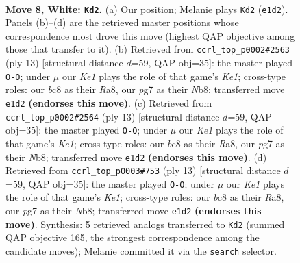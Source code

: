 \documentclass[11pt]{article}
\begin{document}
\begin{figure}[p]\centering
\begin{subfigure}{0.46\textwidth}\centering
\resizebox{\linewidth}{!}{%
\newchessgame
\chessboard[
  setfen={r1b1k2r/ppppqpp1/2n1pn2/7p/2PP4/2B2NP1/PP2PP1P/R2QKB1R w KQkq - 0 8},
  showmover=false,
  pgfstyle=straightmove, color=movearrow, markmove={e1-d2}
]}
\caption{}
\end{subfigure}\hfill
\begin{subfigure}{0.46\textwidth}\centering
\resizebox{\linewidth}{!}{%
\newchessgame
\chessboard[
  setfen={rnbqk2r/pp2ppbp/5np1/3p4/3P4/2N2NP1/PP2PPBP/R1BQK2R b KQkq - 1 7},
  showmover=false,
  pgfstyle=straightmove, color=movearrow, markmove={e8-g8}
]}
\caption{}
\end{subfigure}
\\[4pt]
\begin{subfigure}{0.46\textwidth}\centering
\resizebox{\linewidth}{!}{%
\newchessgame
\chessboard[
  setfen={rnbqk2r/pp2ppbp/5np1/3p4/3P4/2N2NP1/PP2PPBP/R1BQK2R b KQkq - 1 7},
  showmover=false,
  pgfstyle=straightmove, color=movearrow, markmove={e8-g8}
]}
\caption{}
\end{subfigure}\hfill
\begin{subfigure}{0.46\textwidth}\centering
\resizebox{\linewidth}{!}{%
\newchessgame
\chessboard[
  setfen={rnbqk2r/pp2ppbp/5np1/3p4/3P4/2N2NP1/PP2PPBP/R1BQK2R b KQkq - 1 7},
  showmover=false,
  pgfstyle=straightmove, color=movearrow, markmove={e8-g8}
]}
\caption{}
\end{subfigure}
\caption{\textbf{Move 8, White: \texttt{Kd2}.} (a) Our position; Melanie plays \texttt{Kd2} (\texttt{e1d2}). Panels (b)--(d) are the retrieved master positions whose correspondence most drove this move (highest QAP objective among those that transfer to it). (b) Retrieved from \texttt{ccrl\_top\_p0002\#2563} (ply 13) [structural distance $d$=59, QAP obj=35]: the master played \texttt{O-O}; under $\mu$ our \emph{Ke1} plays the role of that game's \emph{Ke1}; cross-type roles: our \emph{b}c8 as their \emph{R}a8, our \emph{p}g7 as their \emph{N}b8; transferred move \texttt{e1d2} \textbf{(endorses this move)}. (c) Retrieved from \texttt{ccrl\_top\_p0002\#2564} (ply 13) [structural distance $d$=59, QAP obj=35]: the master played \texttt{O-O}; under $\mu$ our \emph{Ke1} plays the role of that game's \emph{Ke1}; cross-type roles: our \emph{b}c8 as their \emph{R}a8, our \emph{p}g7 as their \emph{N}b8; transferred move \texttt{e1d2} \textbf{(endorses this move)}. (d) Retrieved from \texttt{ccrl\_top\_p0003\#753} (ply 13) [structural distance $d$=59, QAP obj=35]: the master played \texttt{O-O}; under $\mu$ our \emph{Ke1} plays the role of that game's \emph{Ke1}; cross-type roles: our \emph{b}c8 as their \emph{R}a8, our \emph{p}g7 as their \emph{N}b8; transferred move \texttt{e1d2} \textbf{(endorses this move)}. Synthesis: 5 retrieved analogs transferred to \texttt{Kd2} (summed QAP objective 165, the strongest correspondence among the candidate moves); Melanie committed it via the \texttt{search} selector.}
\label{fig:thought-m14}
\end{figure}
\end{document}
